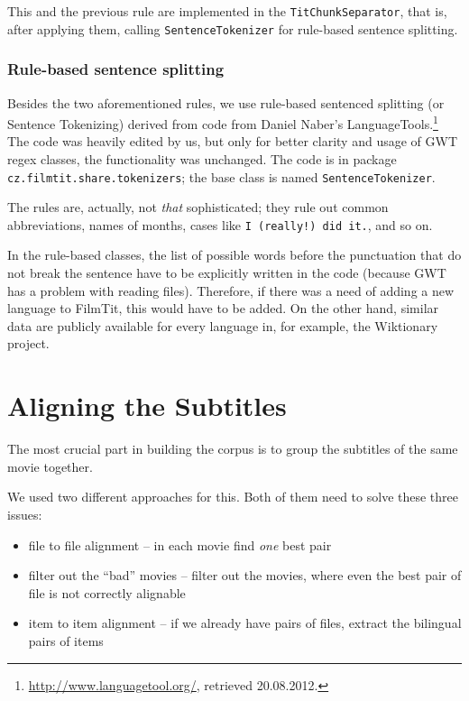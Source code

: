 This and the previous rule are implemented in the \texttt{TitChunkSeparator}, that is, after applying them, calling \texttt{SentenceTokenizer} for rule-based sentence splitting.

\subsubsection*{Rule-based sentence splitting}
Besides the two aforementioned rules, we use rule-based sentenced splitting (or Sentence Tokenizing) derived from code from Daniel Naber's LanguageTools.\footnote{\url{http://www.languagetool.org/}, retrieved 20.08.2012.} The code was heavily edited by us, but only for better clarity and usage of GWT regex classes, the functionality was unchanged. The code is in package \texttt{cz.filmtit.share.tokenizers}; the base class is named \texttt{SentenceTokenizer}.

The rules are, actually, not \emph{that} sophisticated; they rule out common abbreviations, names of months, cases like \texttt{I (really!) did it.}, and so on.

In the rule-based classes, the list of possible words before the punctuation that do not break the sentence have to be explicitly written in the code (because GWT has a problem with reading files). Therefore, if there was a need of adding a new language to FilmTit, this would have to be added. On the other hand, similar data are publicly available for every language in, for example, the Wiktionary project.

\section{Aligning the Subtitles}
\label{sec:aligning_subtitles}
The most crucial part in building the corpus is to group the subtitles of the same movie together.

We used two different approaches for this. Both of them need to solve these three issues:
\begin{itemize}
    \item file to file alignment -- in each movie find \emph{one} best pair
    \item filter out the ``bad'' movies -- filter out the movies, where even the best pair of file is not correctly alignable
    \item item to item alignment -- if we already have pairs of files, extract the bilingual pairs of items 
\end{itemize}

